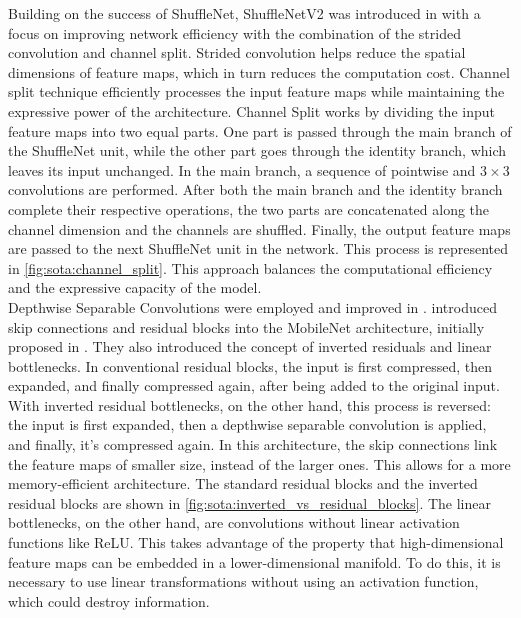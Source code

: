 Building on the success of ShuffleNet, ShuffleNetV2 was introduced in
\cite{MaShuffleNetV2} with a focus on improving network efficiency with the
combination of the strided convolution and channel split. Strided convolution
helps reduce the spatial dimensions of feature maps, which in turn reduces the
computation cost. Channel split technique efficiently processes the input
feature maps while maintaining the expressive power of the architecture. Channel
Split works by dividing the input feature maps into two equal parts. One part is
passed through the main branch of the ShuffleNet unit, while the other part goes
through the identity branch, which leaves its input unchanged. In the main
branch, a sequence of pointwise and $3\times 3$ convolutions are performed.
After both the main branch and the identity branch complete their respective
operations, the two parts are concatenated along the channel dimension and the
channels are shuffled. Finally, the output feature maps are passed to the next
ShuffleNet unit in the network. This process is represented in
\cref{fig:sota:channel_split}. This approach balances the computational
efficiency and the expressive capacity of the model.\\

Depthwise Separable Convolutions were employed and improved in
\cite{howard2017mobilenets}. \citeauthor{DongMobileNetV2} introduced skip
connections and residual blocks into the MobileNet architecture, initially
proposed in \cite{DBLP:conf/cvpr/HeZRS16}. They also introduced the concept of
inverted residuals and linear bottlenecks. In conventional residual blocks, the
input is first compressed, then expanded, and finally compressed again, after
being added to the original input. With inverted residual bottlenecks, on the
other hand, this process is reversed: the input is first expanded, then a
depthwise separable convolution is applied, and finally, it's compressed again.
In this architecture, the skip connections link the feature maps of smaller
size, instead of the larger ones. This allows for a more memory-efficient
architecture. The standard residual blocks and the inverted residual blocks are
shown in \cref{fig:sota:inverted_vs_residual_blocks}. The linear bottlenecks, on
the other hand, are convolutions without linear activation functions like ReLU.
This takes advantage of the property that high-dimensional feature maps can be
embedded in a lower-dimensional manifold. To do this, it is necessary to use
linear transformations without using an activation function, which could destroy
information.\\

